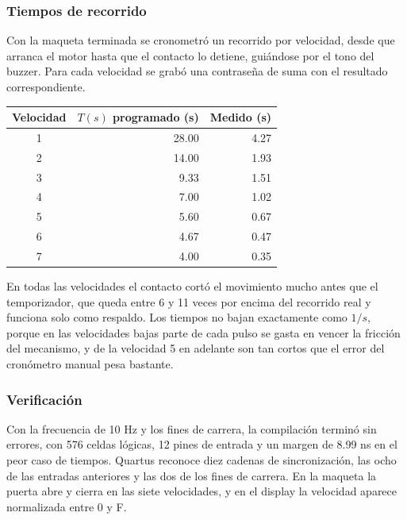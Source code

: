 \documentclass[11pt,letterpaper]{article}
\begin{document}
\subsubsection*{Tiempos de recorrido}

Con la maqueta terminada se cronometró un recorrido por velocidad, desde que arranca el motor hasta que el contacto lo detiene, guiándose por el tono del buzzer. Para cada velocidad se grabó una contraseña de suma con el resultado correspondiente.

\begin{center}
\begin{tabular}{@{}crr@{}}
\toprule
Velocidad & $T(s)$ programado (s) & Medido (s)\\
\midrule
1 & 28.00 & 4.27\\
2 & 14.00 & 1.93\\
3 & 9.33 & 1.51\\
4 & 7.00 & 1.02\\
5 & 5.60 & 0.67\\
6 & 4.67 & 0.47\\
7 & 4.00 & 0.35\\
\bottomrule
\end{tabular}
\end{center}

En todas las velocidades el contacto cortó el movimiento mucho antes que el temporizador, que queda entre 6 y 11 veces por encima del recorrido real y funciona solo como respaldo. Los tiempos no bajan exactamente como $1/s$, porque en las velocidades bajas parte de cada pulso se gasta en vencer la fricción del mecanismo, y de la velocidad 5 en adelante son tan cortos que el error del cronómetro manual pesa bastante.

\subsubsection*{Verificación}

Con la frecuencia de 10 Hz y los fines de carrera, la compilación terminó sin errores, con 576 celdas lógicas, 12 pines de entrada y un margen de 8.99 ns en el peor caso de tiempos. Quartus reconoce diez cadenas de sincronización, las ocho de las entradas anteriores y las dos de los fines de carrera. En la maqueta la puerta abre y cierra en las siete velocidades, y en el display la velocidad aparece normalizada entre 0 y F.
\end{document}
